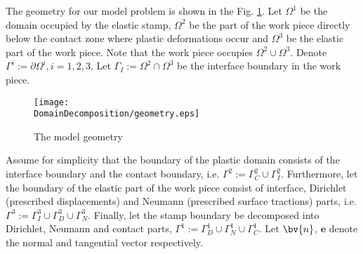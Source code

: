 The geometry for our model problem is shown in the Fig. \ref{fig:scheme}. Let $\Omega^1$ be the domain occupied by the elastic stamp, $\Omega^2$ be the part of the work piece directly below the contact zone where plastic deformations occur and $\Omega^3$ be the elastic part of the work piece. Note that the work piece occupies $\Omega^2 \cup \Omega^3$. Denote $\Gamma^i := \partial \Omega^i, i=1,2,3$. Let $\Gamma_I:=\Omega^2 \cap \Omega^3$ be the interface boundary in the work piece.
\begin{figure}[h!]
\begin{minipage}[c]{15cm}
\begin{center}
     \texttt{[image: \\DomainDecomposition/geometry.eps]}
\caption{ \label{fig:scheme} The model geometry}
\end{center}
\end{minipage}
\end{figure}

Assume for simplicity that the boundary of the plastic domain consists of the interface boundary and the contact boundary, i.e. $  \Gamma^2 := \Gamma^2_C \cup  \Gamma^2_I $. Furthermore, let the boundary of the elastic part of the work piece consist of interface, Dirichlet (prescribed displacements) and Neumann (prescribed surface tractions) parts, i.e. $  \Gamma^3 := \Gamma^3_I \cup  \Gamma^3_D \cup  \Gamma^3_N$. Finally, let the stamp boundary be decomposed into Dirichlet, Neumann and contact parts, $ \Gamma^1 :=  \Gamma^1_D \cup  \Gamma^1_N \cup  \Gamma^1_C $. Let $\bv{n}$, $\mathbf{e}$ denote the normal and tangential vector respectively.

